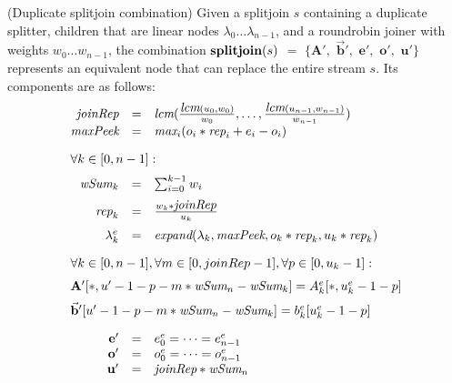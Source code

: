 {\begin{transformation} (Duplicate splitjoin combination)
Given a splitjoin $s$ containing a duplicate splitter, children that
are linear nodes $\lambda_0 \dots \lambda_{n-1}$, and a roundrobin
joiner with weights $w_0 \dots w_{n-1}$, the combination 
$\mbox{\bf splitjoin}(s)$ $=$ $ \{ \mathbf{A}',$ $\vec{\mathbf{b}}',$ $\mathbf{e}',$
$\mathbf{o}',$ $\mathbf{u}'\}$ represents an equivalent node that can
replace the entire stream $s$.  Its components are as follows:
\begin{equation} \nonumber
  \begin{array}{rcl}
    \mt{joinRep} & = & \mt{lcm}(\frac{\mt{lcm}(u_0,w_0)}{w_0}, \dots, \frac{\mt{lcm}(u_{n-1},w_{n-1})}{w_{n-1}}) \\
    \mt{maxPeek} & = & \mt{max}_i (o_i * \mt{rep}_i + e_i - o_i) \\ ~ \vspace{-2pt} \\
    \multicolumn{3}{l}{\forall k \in [0, n-1]:} \\ ~ \vspace{-6pt} \\
    \mt{wSum}_k & = & \sum_{i=0}^{k-1} w_i \\ ~ \vspace{-6pt} \\
    \mt{rep}_k & = & \frac{w_k * \mt{joinRep}}{u_k} \\ ~ \vspace{-6pt} \\
    \lambda_k^e & = & \mt{expand}(\lambda_k, \mt{maxPeek}, 
    o_k * \mt{rep}_k, u_k * \mt{rep}_k) \\ ~ \vspace{-2pt} \\
    \multicolumn{3}{l}{
      \forall k \in [0, n-1], 
      \forall m \in [0, joinRep-1], 
      \forall p \in [0, u_k-1]:
    } \\ ~ \vspace{-6pt} \\
    \multicolumn{3}{l}{\mathbf{A}'[*, u'-1-p - m * \mt{wSum}_{n}-\mt{wSum}_{k}] = %
      A_{k}^e [*,u_k^e-1-p]} \\ ~ \vspace{-6pt} \\
    \multicolumn{3}{l}{\vec{\mathbf{b}}'[u'-1-p - m * \mt{wSum}_{n}-\mt{wSum}_{k}] = 
      b_{k}^e [u_k^e-1-p]} \\ ~ \vspace{-2pt} \\
    \mathbf{e}' & = & e_0^e = \dots = e_{n-1}^e \\
    \mathbf{o}' & = & o_0^e = \dots = o_{n-1}^e \\
    \mathbf{u}' & = & \mt{joinRep} * \mt{wSum}_n \\
  \end{array}
\end{equation}
\end{transformation}

}
